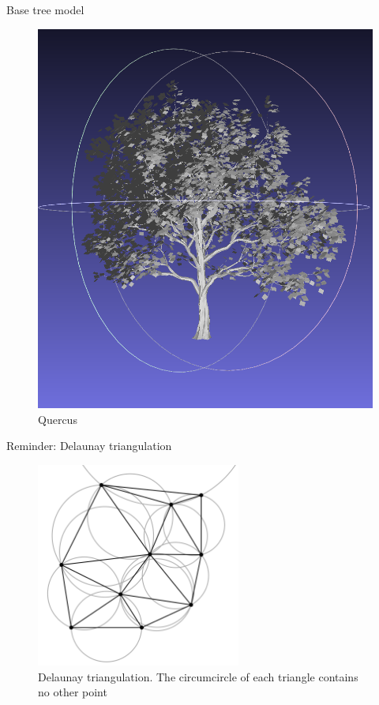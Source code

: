 \documentclass[10pt]{beamer}
\begin{document}
\begin{frame}{Base tree model}
\begin{figure}[H]
\begin{minipage}{0.24\textwidth}
        \includegraphics[width=\textwidth]{images/quercus.png}
        \caption{Quercus}
    \end{minipage}
\end{figure}
\end{frame}


\begin{frame}{Reminder: Delaunay triangulation}
  \Large
  \begin{figure}[H]
    \centering
    \includegraphics[width=0.6\textwidth]{images/Delaunay_circumcircles_vectorial.svg.png}
    \caption{Delaunay triangulation.
    The circumcircle of each triangle contains no other point\cite{delaunay-wiki}}
\end{figure}
\end{frame}
\end{document}
